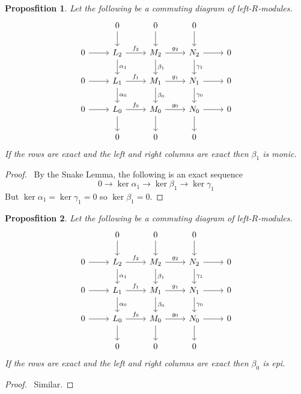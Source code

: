 \documentclass{book}
\let\qed\relax
\newtheorem{prop}{Proposfition}[chapter]
\theoremstyle{definition}
\begin{document}
\begin{prop}
Let the following be a commuting diagram of left-$R$-modules.
\[ \begin{tikzcd}
& 0 \arrow[d] & 0 \arrow[d] & 0 \arrow[d] \\
0 \arrow[r] & L_2 \arrow[r,"f_2"] \arrow[d,"\alpha_1"] & M_2 \arrow[r,"g_2"] \arrow[d,"\beta_1"] & N_2 \arrow[r] \arrow[d,"\gamma_1"] & 0 \\
0 \arrow[r] & L_1 \arrow[r,"f_1"] \arrow[d,"\alpha_0"] & M_1 \arrow[r,"g_1"] \arrow[d,"\beta_0"] & N_1 \arrow[r] \arrow[d,"\gamma_0"] & 0 \\
0 \arrow[r] & L_0 \arrow[r,"f_0"] \arrow[d] & M_0 \arrow[r,"g_0"] \arrow[d] & N_0 \arrow[r] \arrow[d] & 0 \\
& 0 & 0 & 0
\end{tikzcd} \]
If the rows are exact and the left and right columns are exact then $\beta_1$ is monic.
\end{prop}

\begin{proof}
\pf\ By the Snake Lemma, the following is an exact sequence
\[ 0 \rightarrow \ker \alpha_1 \rightarrow \ker \beta_1 \rightarrow \ker \gamma_1 \]
But $\ker \alpha_1 = \ker \gamma_1 = 0$ so $\ker \beta_1 = 0$. \qed
\end{proof}

\begin{prop}
Let the following be a commuting diagram of left-$R$-modules.
\[ \begin{tikzcd}
& 0 \arrow[d] & 0 \arrow[d] & 0 \arrow[d] \\
0 \arrow[r] & L_2 \arrow[r,"f_2"] \arrow[d,"\alpha_1"] & M_2 \arrow[r,"g_2"] \arrow[d,"\beta_1"] & N_2 \arrow[r] \arrow[d,"\gamma_1"] & 0 \\
0 \arrow[r] & L_1 \arrow[r,"f_1"] \arrow[d,"\alpha_0"] & M_1 \arrow[r,"g_1"] \arrow[d,"\beta_0"] & N_1 \arrow[r] \arrow[d,"\gamma_0"] & 0 \\
0 \arrow[r] & L_0 \arrow[r,"f_0"] \arrow[d] & M_0 \arrow[r,"g_0"] \arrow[d] & N_0 \arrow[r] \arrow[d] & 0 \\
& 0 & 0 & 0
\end{tikzcd} \]
If the rows are exact and the left and right columns are exact then $\beta_0$ is epi.
\end{prop}

\begin{proof}
\pf\ Similar. \qed
\end{proof}
\end{document}

